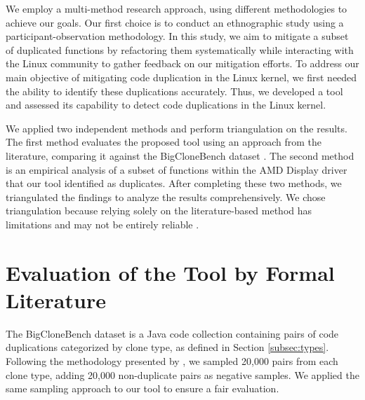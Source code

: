 
We employ a multi-method research approach, using different methodologies to achieve our goals. Our first choice is to conduct an ethnographic study using a participant-observation methodology. In this study, we aim to mitigate a subset of duplicated functions by refactoring them systematically while interacting with the Linux community to gather feedback on our mitigation efforts. To address our main objective of mitigating code duplication in the Linux kernel, we first needed the ability to identify these duplications accurately. Thus, we developed a tool and assessed its capability to detect code duplications in the Linux kernel.

We applied two independent methods and perform triangulation on the results. 
The first method evaluates the proposed tool using an approach from the literature, 
comparing it against the BigCloneBench dataset \citep{bigclonebench}. 
The second method is an empirical analysis of a subset of functions within the 
AMD Display driver that our tool identified as duplicates. After completing these two 
methods, we triangulated the findings to analyze the results comprehensively. 
We chose triangulation because relying solely on the literature-based method has 
limitations and may not be entirely reliable \citep{bigfail, litreview}.

\section{Evaluation of the Tool by Formal Literature}

\label{sec:metbig}

The BigCloneBench dataset \citep{bigclonebench} is a Java code collection containing pairs of code duplications categorized by clone type, as defined in Section \ref{subsec:types}.
%
Following the methodology presented by \citep{tailor}, we sampled 20,000 pairs from each clone type, adding 20,000 non-duplicate pairs as negative samples. We applied the same sampling approach to our tool to ensure a fair evaluation.

